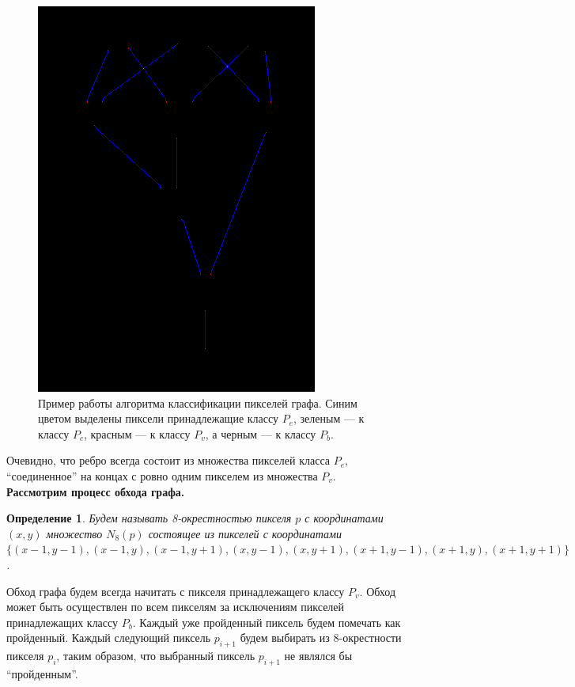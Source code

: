 \documentclass[makeidx, a4paper, 14pt]{extarticle}
\newtheorem{definition}{Определение}
\begin{document}
\begin{figure}[H]
    \centering
    \includegraphics[scale=1]{img4_classified.png}
    \caption{Пример работы алгоритма классификации пикселей графа. Синим цветом выделены пиксели принадлежащие классу $P_e$, зеленым --- к классу $P_c$, красным --- к классу $P_v$, а черным --- к классу $P_b$.}
    \label{fig:img4_classified}
\end{figure}

Очевидно, что ребро всегда состоит из множества пикселей класса $P_e$, ``соединенное'' на концах с ровно одним пикселем из множества $P_v$. \\

\textbf{Рассмотрим процесс обхода графа.}
\begin{definition}
    Будем называть 8-окрестностью пикселя ${p}$ с координатами ${(x, y)}$ множество $N_8(p)$ состоящее из пикселей с координатами
    $\{(x-1, y-1), (x-1, y), (x-1, y+1), (x, y-1), (x, y+1), (x+1, y-1), (x+1, y), (x+1, y+1)\}$.
\end{definition}

Обход графа будем всегда начитать с пикселя принадлежащего классу $P_v$. Обход может быть осуществлен по всем пикселям за исключениям
пикселей принадлежащих классу $P_b$. Каждый уже пройденный пиксель будем помечать как пройденный.
Каждый следующий пиксель $p_{i+1}$ будем выбирать из 8-окрестности пикселя $p_i$, таким образом,
что выбранный пиксель $p_{i+1}$ не являлся бы ``пройденным''.
\end{document}
